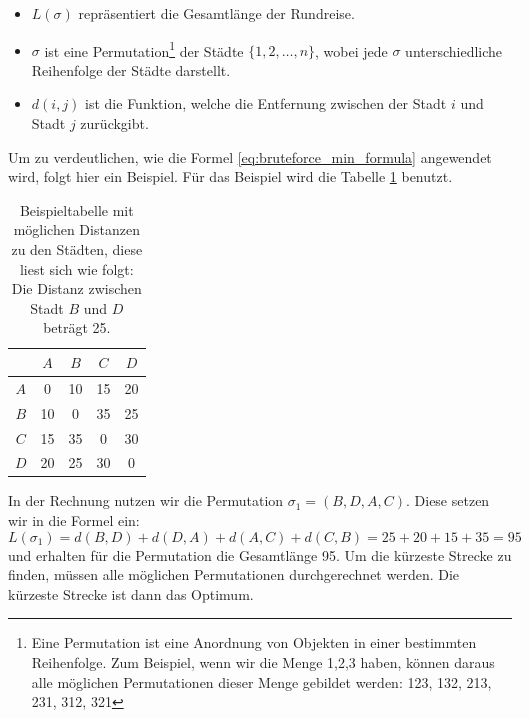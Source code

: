 \begin{itemize}
    \item \( L(\sigma) \) repräsentiert die Gesamtlänge der Rundreise.
    \item \( \sigma \) ist eine Permutation\footnote{
              Eine Permutation ist eine Anordnung von Objekten in einer bestimmten Reihenfolge.
              Zum Beispiel, wenn wir die Menge {1,2,3} haben, können daraus alle möglichen 
              Permutationen dieser Menge gebildet werden: 123, 132, 213, 231, 312, 321 
          }
          der Städte \( \{1, 2, \ldots, n\} \),
          wobei jede \( \sigma \) unterschiedliche Reihenfolge der Städte darstellt.
    \item \( d(i, j) \) ist die Funktion, welche die Entfernung zwischen der Stadt \( i \) und
          Stadt \( j \) zurückgibt.
\end{itemize}
\begin{beispiel}
    \label{buch:paper:varalg:subsection:bruteforce_calculate}
    Um zu verdeutlichen, wie die Formel \eqref{eq:bruteforce_min_formula}
    angewendet wird, folgt hier ein Beispiel. Für das Beispiel wird die Tabelle 
    \ref{tab:example_bruteforce_cities} benutzt.
    \begin{table}
        \centering
        \begin{tabular}{|c|c|c|c|c|}
            \hline
                & $A$ & $B$ & $C$ & $D$ \\ \hline
            $A$ & 0   & 10  & 15  & 20  \\ \hline
            $B$ & 10  & 0   & 35  & 25  \\ \hline
            $C$ & 15  & 35  & 0   & 30  \\ \hline
            $D$ & 20  & 25  & 30  & 0   \\ \hline
        \end{tabular}
        \caption{
            Beispieltabelle mit möglichen Distanzen zu den Städten, diese liest sich wie folgt:
            Die Distanz zwischen Stadt $B$ und $D$ beträgt 25.
        }
        \label{tab:example_bruteforce_cities}
    \end{table}
    In der Rechnung nutzen wir die Permutation $\sigma_1 = (B, D, A, C)$.
    Diese setzen wir in die Formel ein:
    \begin{equation}
        L(\sigma_1) = d(B, D) + d(D, A) + d(A, C) + d(C, B)
        =
        25 + 20 + 15 + 35 = 95
        \label{eq:bruteforce_min_formula_example}
    \end{equation}
    und erhalten für die Permutation die Gesamtlänge 95. Um die kürzeste Strecke zu finden,
    müssen alle möglichen Permutationen durchgerechnet werden. Die kürzeste Strecke ist dann
    das Optimum. 
\end{beispiel}
